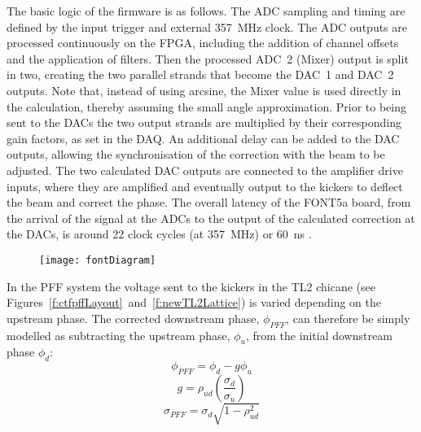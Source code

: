 The basic logic of the firmware is as follows. The ADC sampling and timing are 
defined by the input trigger and external 357~MHz clock. The ADC outputs are 
processed continuously on the FPGA, including the addition of channel offsets 
and the application of filters. Then the processed ADC~2 (Mixer) output is 
split in two, creating the two parallel strands that become the DAC~1 and DAC~2 
outputs. Note that, instead of using arcsine, the Mixer value is used directly 
in the calculation, thereby assuming the small angle approximation. 
Prior to being sent to the DACs the two output strands are 
multiplied by their corresponding gain factors, as set in the DAQ. An 
additional delay can be added to the DAC outputs, allowing the synchronisation 
of the correction with the beam to be adjusted. The two calculated DAC outputs 
are connected to the amplifier drive inputs, where they are amplified and 
eventually output to the kickers to deflect the beam and correct the phase. 
The overall latency of the FONT5a board, from the arrival of the signal at the 
ADCs to the output of the calculated correction at the DACs, is around 22 clock 
cycles (at 357~MHz) or 60~ns \cite{glennCLIC14}.


\begin{figure}
  \texttt{[image: fontDiagram]}%
  \caption{\label{f:fontDiagram}
  }
\end{figure}

In the PFF system the voltage sent to the kickers in the TL2 chicane (see 
Figures~\ref{f:ctfpffLayout}~and~\ref{f:newTL2Lattice}) is varied depending on 
the upstream phase. The corrected downstream phase, \(\phi_{PFF}\), can 
therefore be simply modelled as subtracting the upstream phase, \(\phi_u\), 
from the initial downstream phase \(\phi_d\):
\begin{equation}
\phi_{PFF} = \phi_d - g\phi_u
\label{e:pffEq1}
\end{equation}
\begin{equation}
g = \rho_{ud}\left(\frac{\sigma_d}{\sigma_u}\right)
\label{e:theoretOptGain}
\end{equation}
\begin{equation}
\sigma_{PFF} = \sigma_d\sqrt{1-\rho_{ud}^2}
\end{equation}



